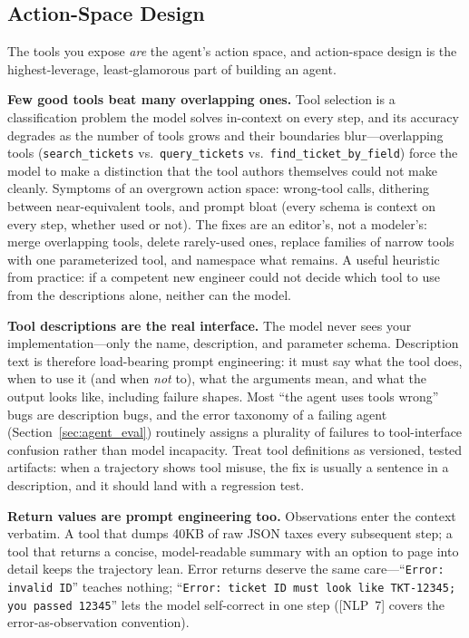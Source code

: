 \subsection{Action-Space Design}

The tools you expose \textit{are} the agent's action space, and action-space design is the highest-leverage, least-glamorous part of building an agent.

\textbf{Few good tools beat many overlapping ones.} Tool selection is a classification problem the model solves in-context on every step, and its accuracy degrades as the number of tools grows and their boundaries blur---overlapping tools (\texttt{search\_tickets} vs.\ \texttt{query\_tickets} vs.\ \texttt{find\_ticket\_by\_field}) force the model to make a distinction that the tool authors themselves could not make cleanly. Symptoms of an overgrown action space: wrong-tool calls, dithering between near-equivalent tools, and prompt bloat (every schema is context on every step, whether used or not). The fixes are an editor's, not a modeler's: merge overlapping tools, delete rarely-used ones, replace families of narrow tools with one parameterized tool, and namespace what remains. A useful heuristic from practice: if a competent new engineer could not decide which tool to use from the descriptions alone, neither can the model.

\textbf{Tool descriptions are the real interface.} The model never sees your implementation---only the name, description, and parameter schema. Description text is therefore load-bearing prompt engineering: it must say what the tool does, when to use it (and when \textit{not} to), what the arguments mean, and what the output looks like, including failure shapes. Most ``the agent uses tools wrong'' bugs are description bugs, and the error taxonomy of a failing agent (Section~\ref{sec:agent_eval}) routinely assigns a plurality of failures to tool-interface confusion rather than model incapacity. Treat tool definitions as versioned, tested artifacts: when a trajectory shows tool misuse, the fix is usually a sentence in a description, and it should land with a regression test.

\textbf{Return values are prompt engineering too.} Observations enter the context verbatim. A tool that dumps 40KB of raw JSON taxes every subsequent step; a tool that returns a concise, model-readable summary with an option to page into detail keeps the trajectory lean. Error returns deserve the same care---``\texttt{Error: invalid ID}'' teaches nothing; ``\texttt{Error: ticket ID must look like TKT-12345; you passed 12345}'' lets the model self-correct in one step ([NLP~7] covers the error-as-observation convention).

